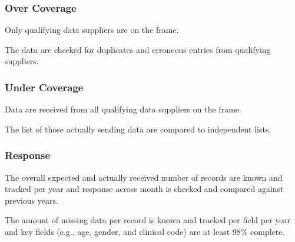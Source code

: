 \subsubsection{Over Coverage}

\begin{QandA}
    \item Only qualifying data suppliers are on the frame.
    \begin{answered}
        
    \end{answered}

    \item The data are checked for duplicates and erroneous entries from qualifying suppliers.
    \begin{answered}
        
    \end{answered}

\end{QandA}

\subsubsection{Under Coverage}

\begin{QandA}
    \item Data are received from all qualifying data suppliers on the frame.
    \begin{answered}
        
    \end{answered}

    \item The list of those actually sending data are compared to independent lists.
    \begin{answered}
        
    \end{answered}

\end{QandA}

\subsubsection{Response}

\begin{QandA}
    \item The overall expected and actually received number of records are known and tracked per year and response across month is checked and compared against previous years.
    \begin{answered}
        
    \end{answered}

    \item The amount of missing data per record is known and tracked per field per year and key fields (e.g., age, gender, and clinical code) are at least 98\% complete.
    \begin{answered}
        
    \end{answered}

\end{QandA}

